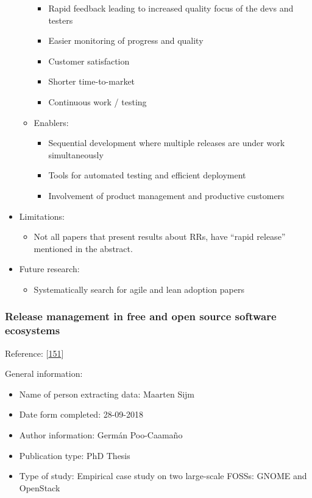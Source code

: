 \documentclass[]{book}
\providecommand{\tightlist}{%
  \setlength{\itemsep}{0pt}\setlength{\parskip}{0pt}}
\begin{document}
\begin{itemize}
\begin{itemize}
    \begin{itemize}
    \tightlist
    \item
      Rapid feedback leading to increased quality focus of the devs and
      testers
    \item
      Easier monitoring of progress and quality
    \item
      Customer satisfaction
    \item
      Shorter time-to-market
    \item
      Continuous work / testing
    \end{itemize}
  \item
    Enablers:

    \begin{itemize}
    \tightlist
    \item
      Sequential development where multiple releases are under work
      simultaneously
    \item
      Tools for automated testing and efficient deployment
    \item
      Involvement of product management and productive customers
    \end{itemize}
  \end{itemize}
\item
  Limitations:

  \begin{itemize}
  \tightlist
  \item
    Not all papers that present results about RRs, have ``rapid
    release'' mentioned in the abstract.
  \end{itemize}
\item
  Future research:

  \begin{itemize}
  \tightlist
  \item
    Systematically search for agile and lean adoption papers
  \end{itemize}
\end{itemize}

\subsubsection{Release management in free and open source software
ecosystems}\label{release-management-in-free-and-open-source-software-ecosystems}

Reference: {[}\protect\hyperlink{ref-poo-caamano2016a}{151}{]}

General information:

\begin{itemize}
\tightlist
\item
  Name of person extracting data: Maarten Sijm
\item
  Date form completed: 28-09-2018
\item
  Author information: Germán Poo-Caamaño
\item
  Publication type: PhD Thesis
\item
  Type of study: Empirical case study on two large-scale FOSSs: GNOME
  and OpenStack
\end{itemize}
\end{document}
